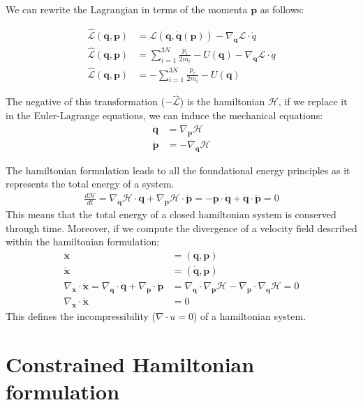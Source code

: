 \documentclass[draft]{agujournal2019}
\begin{document}
We can rewrite the Lagrangian in terms of the momenta $\mathbf{p}$ as follows:

\begin{align}
    \hat{\mathcal{L}}(\mathbf{q}, \mathbf{p}) &= \mathcal{L}(\mathbf{q}, \dot{\mathbf{q}}(\mathbf{p})) - \nabla_{\dot{\mathbf{q}}} \mathcal{L} \cdot \dot{q} \\
    \hat{\mathcal{L}}(\mathbf{q}, \mathbf{p}) &= \sum_{i = 1}^{3N} \frac{p_i}{2m_i} - U(\mathbf{q}) - \nabla_{\dot{\mathbf{q}}} \mathcal{L} \cdot \dot{q} \\
    \hat{\mathcal{L}}(\mathbf{q}, \mathbf{p}) &= - \sum_{i = 1}^{3N} \frac{p_i}{2m_i} - U(\mathbf{q})
\end{align}

The negative of this transformation ($-\hat{\mathcal{L}}$) is the hamiltonian $\mathcal{H}$, if we replace it in the Euler-Lagrange equations, we can induce the mechanical equations:
\begin{align}
    \dot{\mathbf{q}} &= \nabla_\mathbf{p} \mathcal{H} \\
    \dot{\mathbf{p}} &= - \nabla_\mathbf{q} \mathcal{H}
\end{align}
\begin{definition}
    The hamiltonian formulation leads to all the foundational energy principles as it represents the total energy of a system.
    \begin{align}
        \frac{d\mathcal{H}}{dt} = \nabla_\mathbf{q} \mathcal{H} \cdot \dot{\mathbf{q}} + \nabla_\mathbf{p} \mathcal{H} \cdot \dot{\mathbf{p}} = - \mathbf{p} \cdot \dot{\mathbf{q}} + \dot{\mathbf{q}} \cdot \dot{\mathbf{p}} = 0
    \end{align}
    This means that the total energy of a closed hamiltonian system is conserved through time.
    Moreover, if we compute the divergence of a velocity field described within the hamiltonian formulation:
\begin{align}
    \mathbf{x} &= (\mathbf{q}, \mathbf{p}) \\
    \dot{\mathbf{x}} &= (\dot{\mathbf{q}}, \dot{\mathbf{p}}) \\
    \nabla_\mathbf{x} \cdot \dot{\mathbf{x}} = \nabla_\mathbf{q} \cdot \dot{\mathbf{q}} + \nabla_\mathbf{p} \cdot \dot{\mathbf{p}} &= \nabla_\mathbf{q} \cdot \nabla_\mathbf{p} \mathcal{H} - \nabla_\mathbf{p} \cdot \nabla_\mathbf{q} \mathcal{H} = 0 \\
    \nabla_\mathbf{x} \cdot \dot{\mathbf{x}} &= 0
\end{align}
This defines the incompressibility ($\nabla \cdot u = 0$) of a hamiltonian system.


\section{Constrained Hamiltonian formulation}


\end{definition}
\end{document}
